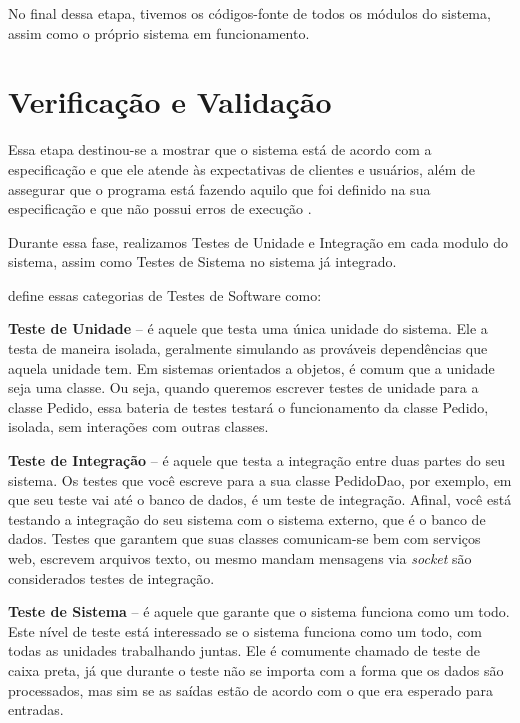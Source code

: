 No final dessa etapa, tivemos os códigos-fonte de todos os módulos do sistema, assim como o próprio sistema em funcionamento. 

\section{Verificação e Validação}
Essa etapa destinou-se a mostrar que o sistema está de acordo com a especificação e que ele atende às expectativas de clientes e usuários, al\'em de assegurar que o  programa está fazendo aquilo que foi definido na sua especificação e que não possui  erros  de execução \cite{aguiar2012requisitos}. 

Durante essa fase, realizamos Testes de Unidade e Integra\c{c}\~ao em cada modulo do sistema, assim como Testes de Sistema no sistema j\'a integrado.

 define essas categorias de Testes de Software como:

\begin{alineascomponto}
	\item \textbf{Teste de Unidade} -- é aquele que testa uma única unidade do sistema. Ele a testa de maneira isolada, geralmente simulando as 
prováveis dependências que aquela unidade tem. Em sistemas orientados a objetos, é comum que a unidade seja uma classe. Ou seja, quando 
queremos escrever testes de unidade para a classe Pedido, essa bateria de testes testará o funcionamento da classe Pedido, 
isolada, sem interações com outras classes.
	\item \textbf{Teste de Integração} -- é aquele que testa a integração entre duas partes do seu sistema. Os testes que você escreve para a sua 
classe PedidoDao, por exemplo, em que seu teste vai até o banco de dados, é um teste de integração. Afinal, você está testando a integração 
do seu sistema com o sistema externo, que é o banco de dados. Testes que garantem que suas classes comunicam-se bem 
com serviços web, escrevem arquivos texto, ou mesmo mandam mensagens via \textit{socket} são considerados testes de integração.
	\item \textbf{Teste de Sistema} -- \'e aquele que garante que o sistema funciona como um todo. Este 
nível de teste está interessado se o sistema funciona como um todo, com todas as 
unidades trabalhando juntas. Ele é comumente chamado de teste de caixa preta, já 
que durante o teste n\~ao se importa com a forma que os dados s\~ao processados, mas sim se as sa\'idas est\~ao de acordo com o que era esperado para entradas. 
\end{alineascomponto}

